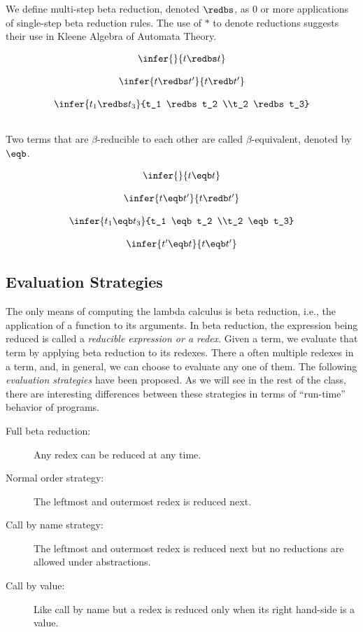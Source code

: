 We define multi-step beta reduction, denoted $\redbs$, as $0$ or more
applications of single-step beta reduction rules.  The use of $*$ to
denote reductions suggests their use in Kleene Algebra of Automata
Theory.

\begin{definition}
\[
\begin{array}{c}
\infer{\strut} {t \redbs t}\\[4mm]
\infer{t \redbs t'} {t \redb t'} \\[4mm]
\infer{t_1 \redbs t_3} {t_1 \redbs t_2 \\t_2 \redbs t_3} \\[4mm]
\end{array}
\]
\end{definition}

Two terms that are $\beta$-reducible to each other are called
$\beta$-equivalent, denoted by $\eqb$. 

\begin{definition}
\[
\begin{array}{c}
\infer{\strut} {t \eqb t} \\[4mm]
\infer{t \eqb t'} {t \redb t'}  \\[4mm]
\infer{t_1 \eqb t_3} {t_1 \eqb t_2 \\t_2 \eqb t_3}  \\[4mm]
\infer{t' \eqb t} {t \eqb t'}
\end{array}
\]
\end{definition}


\subsection{Evaluation Strategies}

The only means of computing the lambda calculus is beta reduction,
i.e., the application of a function to its arguments.  In beta
reduction, the expression being reduced is called a \emph{reducible
  expression or a redex}.  Given a term, we evaluate that term by
applying beta reduction to its redexes.  There a often multiple
redexes in a term, and, in general, we can choose to evaluate any one
of them.  The following \emph{evaluation strategies} have been
proposed.  As we will see in the rest of the class, there are
interesting differences between these strategies in terms of
``run-time'' behavior of programs.

\begin{description}
\item[Full beta reduction:] Any redex can be reduced at any time.
\item[Normal order strategy:] The leftmost and outermost redex is
  reduced next.
\item[Call by name strategy:] The leftmost and outermost redex is
  reduced next but no reductions are allowed under abstractions.
\item[Call by value:] Like call by name but a redex is reduced only
  when its right hand-side is a value.
\end{description}


